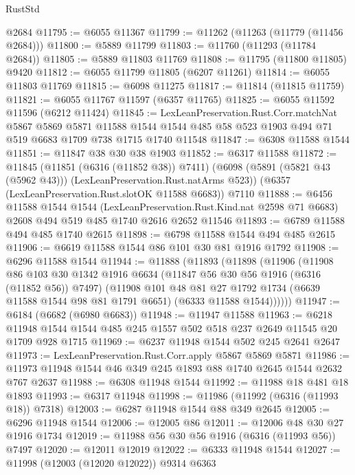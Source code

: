 \begin{lexlean}{RustStd}
\begin{coremodule}
    @2684
@11795 := @6055 @11367
@11799 := @11262 (@11263 (@11779 (@11456 @2684)))
@11800 := @5889 @11799
@11803 := @11760 (@11293 (@11784 @2684))
@11805 := @5889 @11803 @11769
@11808 := @11795 (@11800 @11805) @9420
@11812 := @6055 @11799 @11805 (@6207 @11261)
@11814 := @6055 @11803 @11769
@11815 := @6098 @11275
@11817 := @11814 (@11815 @11759)
@11821 := @6055 @11767 @11597 (@6357 @11765)
@11825 := @6055 @11592 @11596 (@6212 @11424)
@11845 := LexLeanPreservation.Rust.Corr.matchNat
    @5867
    @5869
    @5871
    @11588
    @1544
    @1544
    @485
    @58
    @523
    @1903
    @494
    @71
    @519
    @6683
    @1709
    @738
    @1715
    @1740
    @11548
@11847 := @6308 @11588 @1544
@11851 := @11847 @38 @30 @38 @1903
@11852 := @6317 @11588
@11872 := @11845
    (@11851 (@6316 (@11852 @38)) @7411)
    (@6098 (@5891 (@5821 @43 (@5962 @43))) (LexLeanPreservation.Rust.natArms @523))
    (@6357 (LexLeanPreservation.Rust.slotOK @11588 @6683))
    @7110
@11888 := @6456
    @11588
    @1544
    @1544
    (LexLeanPreservation.Rust.Kind.nat @2598 @71 @6683)
    @2608
    @494
    @519
    @485
    @1740
    @2616
    @2652
    @11546
@11893 := @6789 @11588 @494 @485 @1740 @2615
@11898 := @6798 @11588 @1544 @494 @485 @2615
@11906 := @6619 @11588 @1544 @86 @101 @30 @81 @1916 @1792
@11908 := @6296 @11588 @1544
@11944 := @11888
    (@11893
      (@11898
        (@11906
          (@11908
            @86
            @103
            @30
            @1342
            @1916
            @6634
            (@11847 @56 @30 @56 @1916 (@6316 (@11852 @56)) @7497)
            (@11908
              @101
              @48
              @81
              @27
              @1792
              @1734
              (@6639 @11588 @1544 @98 @81 @1791 @6651)
              (@6333 @11588 @1544))))))
@11947 := @6184 (@6682 (@6980 @6683))
@11948 := @11947 @11588
@11963 := @6218 @11948 @1544 @1544 @485 @245 @1557 @502 @518 @237 @2649 @11545 @20 @1709 @928 @1715
@11969 := @6237 @11948 @1544 @502 @245 @2641 @2647
@11973 := LexLeanPreservation.Rust.Corr.apply @5867 @5869 @5871
@11986 := @11973 @11948 @1544 @46 @349 @245 @1893 @88 @1740 @2645 @1544 @2632 @767 @2637
@11988 := @6308 @11948 @1544
@11992 := @11988 @18 @481 @18 @1893
@11993 := @6317 @11948
@11998 := @11986 (@11992 (@6316 (@11993 @18)) @7318)
@12003 := @6287 @11948 @1544 @88 @349 @2645
@12005 := @6296 @11948 @1544
@12006 := @12005 @86
@12011 := @12006 @48 @30 @27 @1916 @1734
@12019 := @11988 @56 @30 @56 @1916 (@6316 (@11993 @56)) @7497
@12020 := @12011 @12019
@12022 := @6333 @11948 @1544
@12027 := @11998 (@12003 (@12020 @12022)) @9314 @6363

\end{coremodule}
\end{lexlean}
